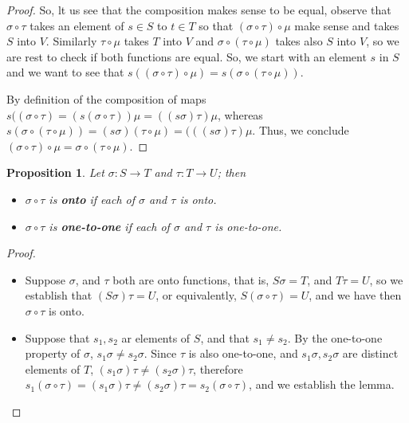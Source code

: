 \documentclass[11pt,a4paper]{article}
\newtheorem{claim}{Proposition}
\begin{document}
\begin{proof}
	So, lt us see that the composition makes sense to be equal, observe that $ \sigma \circ \tau$ takes an element of $ s \in S $ to $ t \in T$ so that $ (\sigma \circ \tau) \circ \mu $ make sense and takes $ S $ into $V$. Similarly $ \tau \circ \mu$ takes $T$ into $V$ and $ \sigma \circ (\tau \circ \mu) $ takes also $S$ into $V$, so we are rest to check if both functions are equal.
	So, we start with an element $s$ in $S$ and we want to see that $ s((\sigma \circ \tau) \circ \mu) = s(\sigma \circ (\tau \circ \mu))$. \par 
	By definition of the composition of maps $s((\sigma \circ \tau) = (s(\sigma \circ \tau))\mu = ((s\sigma)\tau)\mu$, whereas $ s(\sigma \circ (\tau \circ \mu)) = (s \sigma)(\tau \circ \mu) = (((s \sigma)\tau)\mu $. Thus, we conclude $ (\sigma \circ \tau) \circ \mu = \sigma \circ ( \tau \circ \mu). $ 
\end{proof}

\begin{claim} \label{pro:propertystillcomposition}
	Let $\sigma: S \rightarrow T$ and $ \tau: T \rightarrow U$; then
	\begin{itemize}
		\item $\sigma \circ \tau $ is \textbf{onto} if each of $\sigma$ and $\tau$ is onto.
		\item $\sigma \circ \tau $ is \textbf{one-to-one} if each of $\sigma$ and $\tau$ is one-to-one. 
	\end{itemize}
\end{claim}
\begin{proof} \par 
	\begin{itemize}
		\item Suppose $ \sigma $, and $ \tau$ both are onto functions, that is, $ S\sigma = T $, and $T\tau = U$, so we establish that $(S\sigma)\tau = U$, or equivalently, $ S (\sigma \circ \tau) = U$, and we have then $\sigma \circ \tau $  is onto.
		\item Suppose that $s_1,s_2$ ar elements of $S$, and that $ s_1 \neq s_2$. By the one-to-one property of $ \sigma$, $s_1 \sigma \neq s_2 \sigma$. Since $ \tau $ is also one-to-one, and $ s_1 \sigma , s_2 \sigma $ are distinct elements of $T$, $ (s_1 \sigma)\tau \neq (s_2 \sigma)\tau $, therefore $ s_1(\sigma \circ \tau) = (s_1 \sigma) \tau \neq (s_2 \sigma)\tau = s_2(\sigma \circ \tau)$, and we establish the lemma.
	\end{itemize}
\end{proof}
\end{document}
